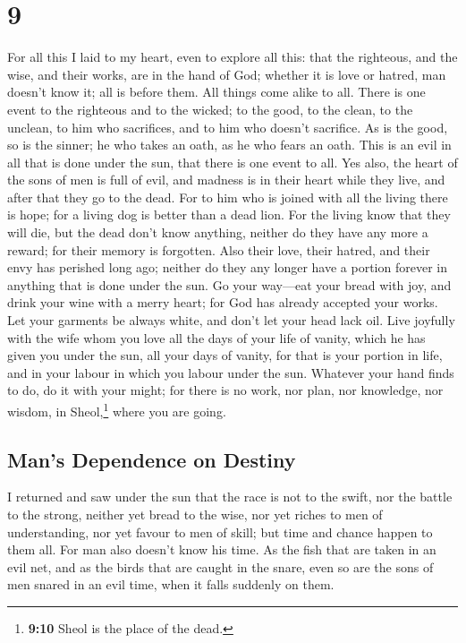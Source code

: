 \hypertarget{section-8}{%
\section{9}\label{section-8}}

 For all this I laid to my heart, even to explore all
this: that the righteous, and the wise, and their works, are in the hand
of God; whether it is love or hatred, man doesn't know it; all is before
them.  All things come alike to all. There is one event to
the righteous and to the wicked; to the good, to the clean, to the
unclean, to him who sacrifices, and to him who doesn't sacrifice. As is
the good, so is the sinner; he who takes an oath, as he who fears an
oath.  This is an evil in all that is done under the sun,
that there is one event to all. Yes also, the heart of the sons of men
is full of evil, and madness is in their heart while they live, and
after that they go to the dead.  For to him who is joined
with all the living there is hope; for a living dog is better than a
dead lion.  For the living know that they will die, but
the dead don't know anything, neither do they have any more a reward;
for their memory is forgotten.  Also their love, their
hatred, and their envy has perished long ago; neither do they any longer
have a portion forever in anything that is done under the sun.
 Go your way---eat your bread with joy, and drink your
wine with a merry heart; for God has already accepted your works.
 Let your garments be always white, and don't let your
head lack oil.  Live joyfully with the wife whom you love
all the days of your life of vanity, which he has given you under the
sun, all your days of vanity, for that is your portion in life, and in
your labour in which you labour under the sun.  Whatever
your hand finds to do, do it with your might; for there is no work, nor
plan, nor knowledge, nor wisdom, in Sheol,\footnote{\textbf{9:10} Sheol
  is the place of the dead.} where you are going.

\hypertarget{mans-dependence-on-destiny}{%
\subsection{Man's Dependence on
Destiny}\label{mans-dependence-on-destiny}}

 I returned and saw under the sun that the race is not to
the swift, nor the battle to the strong, neither yet bread to the wise,
nor yet riches to men of understanding, nor yet favour to men of skill;
but time and chance happen to them all.  For man also
doesn't know his time. As the fish that are taken in an evil net, and as
the birds that are caught in the snare, even so are the sons of men
snared in an evil time, when it falls suddenly on them.

